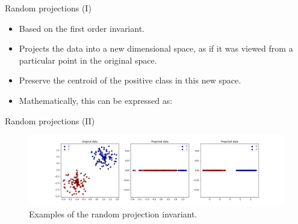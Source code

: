 \documentclass[10pt, dvipsnames]{beamer}
\begin{document}
\begin{frame}{Random projections (I)}
    \begin{itemize}
        \item<1-> Based on the \alert{first order invariant}.
        \item<2-> Projects the data into a new dimensional space, as if it was viewed from a particular
        point in the original space.
        \item<3-> Preserve the centroid of the positive class in this new space.
        \item<4-> Mathematically, this can be expressed as:
    \end{itemize}

    
\end{frame}

\begin{frame}{Random projections (II)}
    \begin{figure}[H]
        \centering
        \includegraphics[width=\textwidth]{thesis/Figures/random_projections_example.png}
        \caption{Examples of the random projection invariant.}
    \end{figure}
\end{frame}
\end{document}
